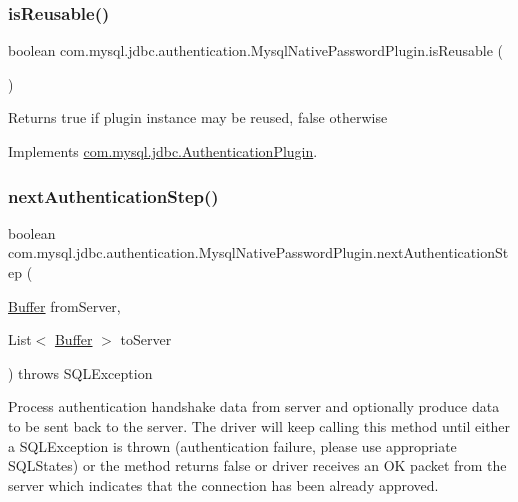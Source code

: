 \subsubsection{\texorpdfstring{is\+Reusable()}{isReusable()}}
{\footnotesize\ttfamily boolean com.\+mysql.\+jdbc.\+authentication.\+Mysql\+Native\+Password\+Plugin.\+is\+Reusable (\begin{DoxyParamCaption}{ }\end{DoxyParamCaption})}

\begin{DoxyReturn}{Returns}
true if plugin instance may be reused, false otherwise 
\end{DoxyReturn}


Implements \mbox{\hyperlink{interfacecom_1_1mysql_1_1jdbc_1_1_authentication_plugin_abf6de7affb05904b1dba5517a17421d1}{com.\+mysql.\+jdbc.\+Authentication\+Plugin}}.

\mbox{\label{classcom_1_1mysql_1_1jdbc_1_1authentication_1_1_mysql_native_password_plugin_af91bb791cd53bd81559d8101f962618f}} 
\subsubsection{\texorpdfstring{next\+Authentication\+Step()}{nextAuthenticationStep()}}
{\footnotesize\ttfamily boolean com.\+mysql.\+jdbc.\+authentication.\+Mysql\+Native\+Password\+Plugin.\+next\+Authentication\+Step (\begin{DoxyParamCaption}\item[{\mbox{\hyperlink{classcom_1_1mysql_1_1jdbc_1_1_buffer}{Buffer}}}]{from\+Server,  }\item[{List$<$ \mbox{\hyperlink{classcom_1_1mysql_1_1jdbc_1_1_buffer}{Buffer}} $>$}]{to\+Server }\end{DoxyParamCaption}) throws S\+Q\+L\+Exception}

Process authentication handshake data from server and optionally produce data to be sent back to the server. The driver will keep calling this method until either a S\+Q\+L\+Exception is thrown (authentication failure, please use appropriate S\+Q\+L\+States) or the method returns false or driver receives an OK packet from the server which indicates that the connection has been already approved.

